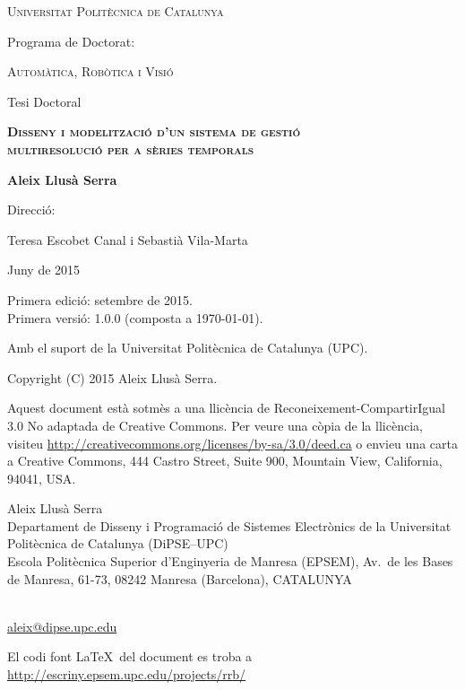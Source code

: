 \begin{titlepage}
  \begin{center} 

   

    {\Large \scshape Universitat Politècnica de Catalunya} \vskip 1cm 

    {Programa de Doctorat:} \vskip 0.5cm 
    
    {\scshape Automàtica, Robòtica i Visió} \vfill%

    {Tesi Doctoral} \vskip 1cm 
    
    {\scshape \bfseries \Large Disseny i modelització d'un sistema de gestió\\
 multiresolució per a sèries temporals} \vskip 2cm

    {\bfseries Aleix Llusà Serra} \vfill%

    {Direcció:}
       
    {Teresa Escobet Canal i
    Sebastià Vila-Marta}  \vskip 1cm 

    {Juny de 2015}

\end{center}
\end{titlepage}


{
  \thispagestyle{empty}

  \mbox{}

  \vfill

  Primera edició: setembre de 2015. %
  \\
  {\small Primera versió: 1.0.0 (composta a \today).} 

  \mbox{}

  {\footnotesize
  Amb el suport de la Universitat Politècnica de Catalunya (UPC).
  

  }

  \cc\bysa

  {\small
  Copyright (C) 2015 Aleix Llusà Serra.
  

  {\footnotesize
    Aquest document està sotmès a una llicència de Reconeixement-CompartirIgual 3.0 No adaptada de Creative Commons. Per veure una còpia de la llicència, visiteu \url{http://creativecommons.org/licenses/by-sa/3.0/deed.ca} o envieu una carta a Creative Commons, 444 Castro Street, Suite 900, Mountain View, California, 94041, USA.
  }

    Aleix Llusà Serra\\
    Departament de Disseny i Programació de Sistemes Electrònics
      de la Universitat Politècnica de Catalunya (DiPSE--UPC)\\
    Escola Politècnica Superior d'Enginyeria de Manresa (EPSEM),
    Av.\ de les Bases de Manresa, 61-73,
    08242 Manresa (Barcelona),
    CATALUNYA 
    }\\
    \url{aleix@dipse.upc.edu}

    {\footnotesize
      El codi font \LaTeX\ del document es troba a 
      \url{http://escriny.epsem.upc.edu/projects/rrb/}
    }
}





